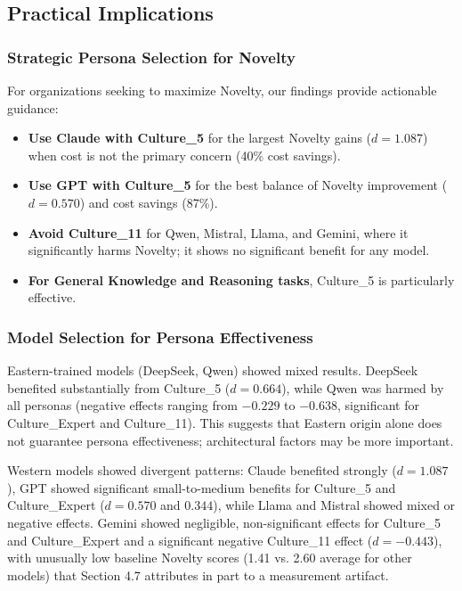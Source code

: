 \documentclass{article}
\begin{document}
\subsection{Practical Implications}

\subsubsection{Strategic Persona Selection for Novelty}

For organizations seeking to maximize Novelty, our findings provide actionable guidance:

\begin{itemize}
    \item \textbf{Use Claude with Culture\_5} for the largest Novelty gains (\(d = 1.087\)) when cost is not the primary concern (40\% cost savings).
    \item \textbf{Use GPT with Culture\_5} for the best balance of Novelty improvement (\(d = 0.570\)) and cost savings (87\%).
    \item \textbf{Avoid Culture\_11} for Qwen, Mistral, Llama, and Gemini, where it significantly harms Novelty; it shows no significant benefit for any model.
    \item \textbf{For General Knowledge and Reasoning tasks}, Culture\_5 is particularly effective.
\end{itemize}

\subsubsection{Model Selection for Persona Effectiveness}

Eastern-trained models (DeepSeek, Qwen) showed mixed results. DeepSeek benefited substantially from Culture\_5 (\(d = 0.664\)), while Qwen was harmed by all personas (negative effects ranging from \(-0.229\) to \(-0.638\), significant for Culture\_Expert and Culture\_11). This suggests that Eastern origin alone does not guarantee persona effectiveness; architectural factors may be more important.

Western models showed divergent patterns: Claude benefited strongly (\(d = 1.087\)), GPT showed significant small-to-medium benefits for Culture\_5 and Culture\_Expert (\(d = 0.570\) and \(0.344\)), while Llama and Mistral showed mixed or negative effects. Gemini showed negligible, non-significant effects for Culture\_5 and Culture\_Expert and a significant negative Culture\_11 effect (\(d = -0.443\)), with unusually low baseline Novelty scores (1.41 vs. 2.60 average for other models) that Section 4.7 attributes in part to a measurement artifact.
\end{document}
